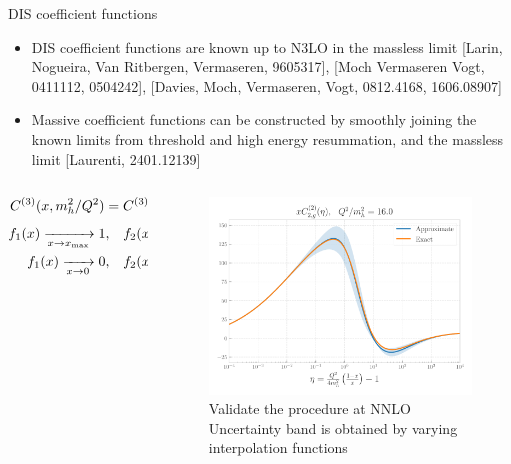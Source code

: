 \documentclass[8pt,t]{beamer}
\begin{document}
\begin{frame}{DIS coefficient functions}
  \begin{itemize}
    \item DIS coefficient functions are known up to N3LO in the massless limit {\color{gray}\footnotesize [Larin, Nogueira, Van Ritbergen, Vermaseren, 9605317], [Moch Vermaseren Vogt, 0411112, 0504242], [Davies, Moch, Vermaseren, Vogt, 0812.4168, 1606.08907]}
    \item Massive coefficient functions can be constructed by smoothly joining the known limits from threshold and high energy resummation, and the massless limit {\color{gray}\footnotesize [Laurenti, 2401.12139]}
  \end{itemize}

  \vspace*{-0.5em}
  \begin{columns}
    \begin{column}{0.49\textwidth}
      \begin{equation*}
        C^{(3)}(x,m_h^2/Q^2) = C^{(3),{\rm thr}}(x,m_h^2/Q^2) f_1(x) + C^{(3),{\rm asy}}(x,m_h^2/Q^2) f_2(x)
      \end{equation*}
      \begin{align*}
        \begin{split}
          f_1(x) \xrightarrow[x \to x_{\rm max}]{} 1, & \quad  f_2(x) \xrightarrow[x \to x_{\rm max}]{} 0 \\
          f_1(x) \xrightarrow[x \to 0]{} 0, & \quad  f_2(x) \xrightarrow[x \to 0]{} 1
        \end{split}
      \end{align*}
    \end{column}
    \begin{column}{0.49\textwidth}

      \vspace*{2.5em}
      \begin{figure}
        \centering
        \includegraphics[width=.9\textwidth]{dis_coeff_n3lo.pdf}
        \caption*{
          Validate the procedure at NNLO \\
          Uncertainty band is obtained by varying interpolation functions
        }
      \end{figure}
    \end{column}
  \end{columns}
\end{frame}
\end{document}
